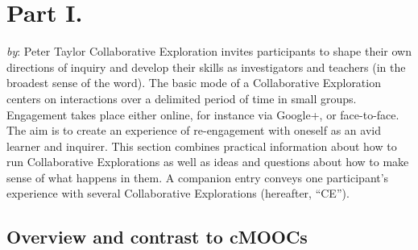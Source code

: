 \section*{Part I.}

\emph{by}: Peter Taylor Collaborative Exploration invites participants
to shape their own directions of inquiry and develop their skills as
investigators and teachers (in the broadest sense of the word). The
basic mode of a Collaborative Exploration centers on interactions over a
delimited period of time in small groups. Engagement takes place either
online, for instance via Google+, or face-to-face. The aim is to create
an experience of re-engagement with oneself as an avid learner and
inquirer. This section combines practical information about how to run
Collaborative Explorations as well as ideas and questions about how to
make sense of what happens in them. A companion entry conveys one
participant's experience with several Collaborative Explorations
(hereafter, ``CE'').

\subsection{Overview and contrast to cMOOCs}

